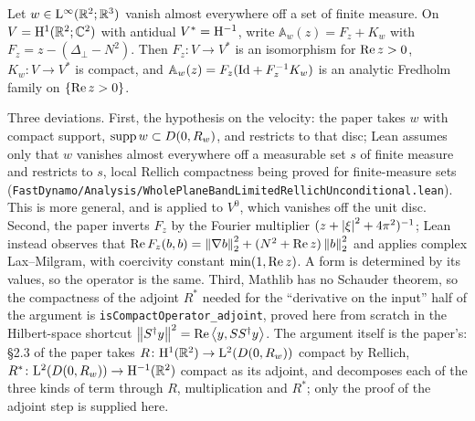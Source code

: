\begin{lemma}
  \label{lem:local:compactness}
  \leanok
  Let $w\in\mathrm{L}^\infty(\mathbb{R}^2;\mathbb{R}^3)$ vanish almost everywhere off a set of finite measure.
  On $V=\mathrm{H}^1(\mathbb{R}^2;\mathbb{C}^2)$ with antidual $V^*=\mathrm{H}^{-1}$, write
  $\mathbb A_w(z)=F_z+K_w$ with $F_z=z-(\Delta_\perp-N^2)$.  Then $F_z\colon V\to V^*$ is
  an isomorphism for $\operatorname{Re} z>0$, $K_w\colon V\to V^*$ is compact, and
  $\mathbb A_w(z)=F_z(\mathrm{Id}+F_z^{-1}K_w)$ is an analytic Fredholm family on $\{\operatorname{Re} z>0\}$.
\end{lemma}

Three deviations.  First, the hypothesis on the velocity: the paper takes $w$ with compact
support, $\operatorname{supp} w\subset D(0,R_w)$, and restricts to that disc; Lean assumes only that $w$
vanishes almost everywhere off a measurable set $s$ of finite measure and restricts to $s$,
local Rellich compactness being proved for finite-measure sets
(\texttt{FastDynamo/Analysis/WholePlaneBandLimitedRellichUnconditional.lean}).  This is more
general, and is applied to $V^0$, which vanishes off the unit disc.  Second, the paper
inverts $F_z$ by the Fourier multiplier $(z+\left\lvert\xi\right\rvert^2+4\pi^2)^{-1}$; Lean instead observes that
$\operatorname{Re} F_z(b,b)=\left\|\nabla b\right\|_2^2+(N^2+\operatorname{Re} z)\left\|b\right\|_2^2$ and applies complex
Lax--Milgram, with coercivity constant $\min(1,\operatorname{Re} z)$.  A form is determined by its
values, so the operator is the same.  Third, Mathlib has no Schauder theorem, so the
compactness of the adjoint $R^*$ needed for the ``derivative on the input'' half of the
argument is \texttt{isCompactOperator\_adjoint}, proved here from scratch in the
Hilbert-space shortcut $\left\|S^\dagger y\right\|^2=\operatorname{Re}\left\langle y,SS^\dagger y\right\rangle$.  The argument itself
is the paper's: §2.3 of the paper takes $R\colon\mathrm{H}^1(\mathbb{R}^2)\to\mathrm{L}^2(D(0,R_w))$ compact by
Rellich, $R^*\colon\mathrm{L}^2(D(0,R_w))\to\mathrm{H}^{-1}(\mathbb{R}^2)$ compact as its adjoint, and decomposes
each of the three kinds of term through $R$, multiplication and $R^*$; only the proof of the
adjoint step is supplied here.

